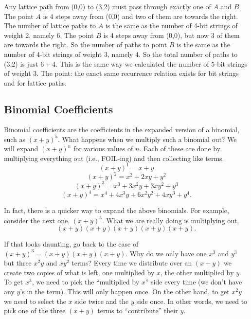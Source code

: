 \documentclass[10pt,]{book}
\theoremstyle{plain}
\theoremstyle{definition}
\theoremstyle{definition}
\theoremstyle{definition}
\numberwithin{equation}{section}
\begin{document}
        Any lattice path from (0,0) to (3,2) must pass through exactly one of \(A\) and \(B\). The point \(A\) is 4 steps away from (0,0) and two of them are towards the right. The number of lattice paths to \(A\) is the same as the number of 4-bit strings of weight 2, namely 6. The point \(B\) is 4 steps away from (0,0), but now 3 of them are towards the right. So the number of paths to point \(B\) is the same as the number of 4-bit strings of weight 3, namely 4. So the total number of paths to (3,2) is just \(6+4\). This is the same way we calculated the number of 5-bit strings of weight 3. The point: the exact same recurrence relation exists for bit strings and for lattice paths.
\typeout{************************************************}
\typeout{************************************************}
\subsection[Binomial Coefficients]{Binomial Coefficients}\label{subsection-15}

        Binomial coefficients are the coefficients in the expanded version of a binomial, such as \((x+y)^5\). What happens when we multiply such a binomial out? We will expand \((x+y)^n\) for various values of \(n\). Each of these are done by multiplying everything out (i.e., FOIL-ing) and then collecting like terms.
        \begin{equation*}
          (x+y)^1 = x + y
        \end{equation*}
\begin{equation*}
        (x+y)^2 = x^2 + 2xy + y^2
      \end{equation*}\begin{equation*}
        (x+y)^3 = x^3 + 3x^2y + 3xy^2 + y^3
      \end{equation*}\begin{equation*}
        (x+y)^4 = x^4 + 4x^3y + 6x^2y^2 + 4xy^3 + y^4.
      \end{equation*}\par

        In fact, there is a quicker way to expand the above binomials. For example, consider the next one, \((x+y)^5\). What we are really doing is multiplying out,
        \begin{equation*}
          (x+y)(x+y)(x+y)(x+y)(x+y).
        \end{equation*}
\par
If that looks daunting, go back to the case of \((x+y)^3 = (x+y)(x+y)(x+y)\). Why do we only have one \(x^3\) and \(y^3\) but three \(x^2y\) and \(xy^2\) terms? Every time we distribute over an \((x+y)\) we create two copies of what is left, one multiplied by \(x\), the other multiplied by \(y\). To get \(x^3\), we need to pick the ``multiplied by \(x\)'' side every time (we don't have any \(y\)'s in the term). This will only happen once. On the other hand, to get \(x^2y\) we need to select the \(x\) side twice and the \(y\) side once. In other words, we need to pick one of the three \((x+y)\) terms to ``contribute'' their \(y\).
\par
\end{document}
